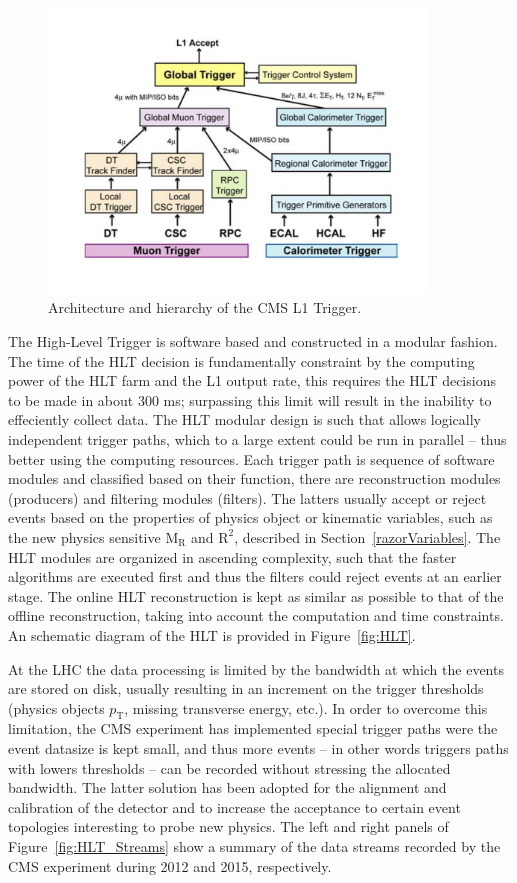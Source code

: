 \begin{figure}
 \centering
\includegraphics[width=0.9\textwidth]{CMS_DetectorFigures/L1Trigger.pdf}
\caption{Architecture and hierarchy of the CMS L1 Trigger.\label{fig:L1}}
\end{figure}

The High-Level Trigger is software based and constructed in a modular
fashion. The time of the HLT decision is fundamentally constraint by
the computing power of the HLT farm and the L1 output rate, this
requires the HLT decisions to be made in about 300 ms; surpassing this
limit will result in the inability to effeciently collect data. The
HLT modular design is such that allows logically independent trigger
paths, which to a large extent could be run in parallel -- thus better
using the computing resources. Each trigger path is sequence of
software modules and classified based on their function, there are
reconstruction modules (producers) and filtering modules
(filters). The latters usually accept or reject events based on the
properties of physics object or kinematic variables, such as the new
physics sensitive $\mathrm{M_{R}}$ and $\mathrm{R^{2}}$, described in
Section~\ref{razorVariables}. The HLT modules are organized in
ascending complexity, such that the faster algorithms are executed
first and thus the filters could reject events at an earlier
stage. The online HLT reconstruction is kept as similar as
possible to that of the offline reconstruction, taking into account
the computation and time constraints. An schematic diagram of the HLT
is provided in Figure~\ref{fig:HLT}. 

At the LHC the data processing is limited by the bandwidth at which
the events are stored on disk, usually resulting in an increment on
the trigger thresholds (physics objects $p_{\mathrm{T}}$, missing
transverse energy, etc.). In order to overcome this limitation, the
CMS experiment has implemented special trigger paths were the event
datasize is kept small, and thus more events -- in other words
triggers paths with lowers thresholds -- can be recorded without
stressing the allocated bandwidth. The latter solution has been
adopted for the alignment and calibration of the detector and to
increase the acceptance to certain event topologies interesting to
probe new physics. The left and right panels of Figure~\ref{fig:HLT_Streams} show a summary of the
data streams recorded by the CMS experiment during 2012 and 2015,
respectively.

